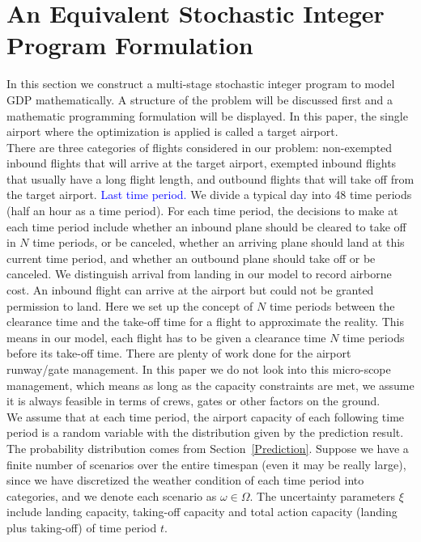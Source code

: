 \documentclass[12pt]{article}
\begin{document}
\section{An Equivalent Stochastic Integer Program Formulation}\label{Model}
	In this section we construct a multi-stage stochastic integer program to model GDP mathematically. A structure of the problem will be discussed first and a mathematic programming formulation will be displayed. In this paper, the single airport where the optimization is applied is called a target airport.\\
	\newline There are three categories of flights considered in our problem: non-exempted inbound flights that will arrive at the target airport, exempted inbound flights that usually have a long flight length, and outbound flights that will take off from the target airport. \textcolor{blue}{Last time period.} We divide a typical day into 48 time periods (half an hour as a time period). For each time period, the decisions to make at each time period include whether an inbound plane should be cleared to take off in \(N\) time periods, or be canceled, whether an arriving plane should land at this current time period, and whether an outbound plane should take off or be canceled. We distinguish  arrival from landing in our model to record airborne cost. An inbound flight can arrive at the airport but could not be granted permission to land. Here we set up the concept of \(N\) time periods between the clearance time and the take-off time for a flight to approximate the reality. This means in our model, each flight has to be given a clearance time \(N\) time periods before its take-off time. There are plenty of work done for the airport runway/gate management. In this paper we do not look into this micro-scope management, which means as long as the capacity constraints are met, we assume it is always feasible in terms of crews, gates or other factors on the ground.\\
	\newline %
	We assume that at each time period, the airport capacity of each following time period is a random variable with the distribution given by the prediction result. The probability distribution comes from Section~\ref{Prediction}. Suppose we have a finite number of scenarios over the entire timespan (even it may be really large), since we have discretized the weather condition of each time period into categories, and we denote each scenario as \(\omega \in \Omega\). The uncertainty parameters \(\xi\) include landing capacity, taking-off capacity and total action capacity (landing plus taking-off) of time period \(t\). \\
\end{document}
